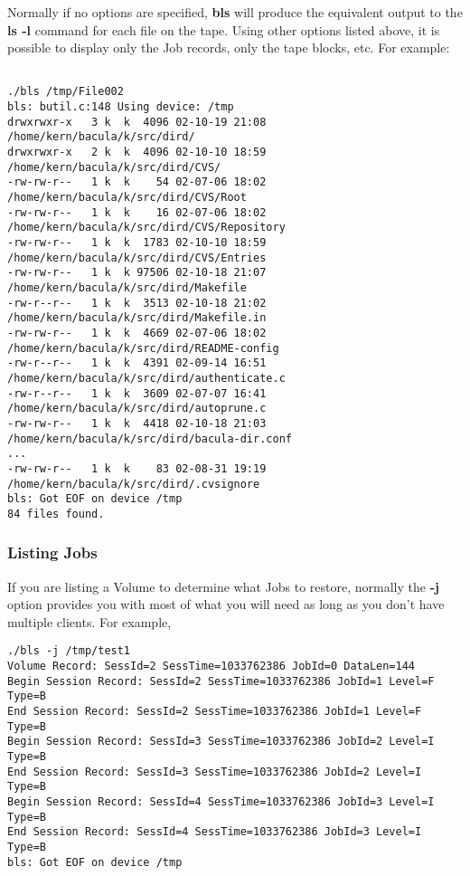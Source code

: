 Normally if no options are specified, {\bf bls} will produce the equivalent
output to the {\bf ls -l} command for each file on the tape. Using other
options listed above, it is possible to display only the Job records, only the
tape blocks, etc. For example: 

\footnotesize
\begin{verbatim}
 
./bls /tmp/File002
bls: butil.c:148 Using device: /tmp
drwxrwxr-x   3 k  k  4096 02-10-19 21:08  /home/kern/bacula/k/src/dird/
drwxrwxr-x   2 k  k  4096 02-10-10 18:59  /home/kern/bacula/k/src/dird/CVS/
-rw-rw-r--   1 k  k    54 02-07-06 18:02  /home/kern/bacula/k/src/dird/CVS/Root
-rw-rw-r--   1 k  k    16 02-07-06 18:02  /home/kern/bacula/k/src/dird/CVS/Repository
-rw-rw-r--   1 k  k  1783 02-10-10 18:59  /home/kern/bacula/k/src/dird/CVS/Entries
-rw-rw-r--   1 k  k 97506 02-10-18 21:07  /home/kern/bacula/k/src/dird/Makefile
-rw-r--r--   1 k  k  3513 02-10-18 21:02  /home/kern/bacula/k/src/dird/Makefile.in
-rw-rw-r--   1 k  k  4669 02-07-06 18:02  /home/kern/bacula/k/src/dird/README-config
-rw-r--r--   1 k  k  4391 02-09-14 16:51  /home/kern/bacula/k/src/dird/authenticate.c
-rw-r--r--   1 k  k  3609 02-07-07 16:41  /home/kern/bacula/k/src/dird/autoprune.c
-rw-rw-r--   1 k  k  4418 02-10-18 21:03  /home/kern/bacula/k/src/dird/bacula-dir.conf
...
-rw-rw-r--   1 k  k    83 02-08-31 19:19  /home/kern/bacula/k/src/dird/.cvsignore
bls: Got EOF on device /tmp
84 files found.
\end{verbatim}
\normalsize

\subsubsection*{Listing Jobs}

If you are listing a Volume to determine what Jobs to restore, normally the
{\bf -j} option provides you with most of what you will need as long as you
don't have multiple clients. For example, 

\footnotesize
\begin{verbatim}
./bls -j /tmp/test1
Volume Record: SessId=2 SessTime=1033762386 JobId=0 DataLen=144
Begin Session Record: SessId=2 SessTime=1033762386 JobId=1 Level=F Type=B
End Session Record: SessId=2 SessTime=1033762386 JobId=1 Level=F Type=B
Begin Session Record: SessId=3 SessTime=1033762386 JobId=2 Level=I Type=B
End Session Record: SessId=3 SessTime=1033762386 JobId=2 Level=I Type=B
Begin Session Record: SessId=4 SessTime=1033762386 JobId=3 Level=I Type=B
End Session Record: SessId=4 SessTime=1033762386 JobId=3 Level=I Type=B
bls: Got EOF on device /tmp
\end{verbatim}
\normalsize

